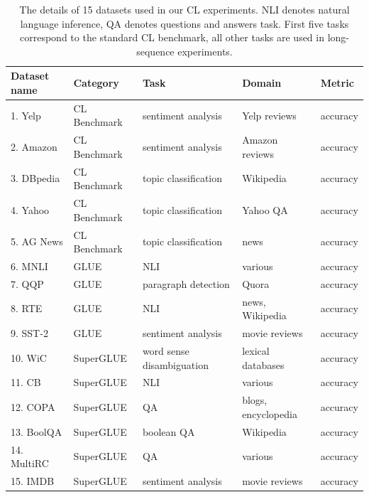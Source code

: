 \documentclass[letterpaper]{article} %
\begin{document}
\begin{table}[htbp]
\centering
\begin{tabular}{lllll}
\toprule
\textbf{Dataset name} & \textbf{Category} & \textbf{Task} & \textbf{Domain} & \textbf{Metric} \\
\midrule
1. Yelp    & CL Benchmark & sentiment analysis      & Yelp reviews     & accuracy \\
2. Amazon  & CL Benchmark & sentiment analysis      & Amazon reviews   & accuracy \\
3. DBpedia & CL Benchmark & topic classification    & Wikipedia        & accuracy \\
4. Yahoo   & CL Benchmark & topic classification    & Yahoo QA       & accuracy \\
5. AG News & CL Benchmark & topic classification    & news             & accuracy \\
6. MNLI    & GLUE         & NLI                    & various          & accuracy \\
7. QQP     & GLUE         & paragraph detection     & Quora            & accuracy \\
8. RTE     & GLUE         & NLI                    & news, Wikipedia  & accuracy \\
9. SST-2   & GLUE         & sentiment analysis      & movie reviews    & accuracy \\
10. WiC    & SuperGLUE    & word sense disambiguation & lexical databases & accuracy \\
11. CB     & SuperGLUE    & NLI                    & various          & accuracy \\
12. COPA   & SuperGLUE    & QA                     & blogs, encyclopedia & accuracy \\
13. BoolQA & SuperGLUE    & boolean QA             & Wikipedia        & accuracy \\
14. MultiRC& SuperGLUE    & QA                     & various          & accuracy \\
15. IMDB   & SuperGLUE    & sentiment analysis      & movie reviews    & accuracy \\
\bottomrule
\end{tabular}
\label{table:data}
\caption{The details of 15 datasets used in our CL experiments. NLI denotes natural language inference, QA denotes questions and answers task. First five tasks correspond to the standard CL benchmark, all other tasks are used in long-sequence experiments.}
\end{table}



% 
\end{document}
